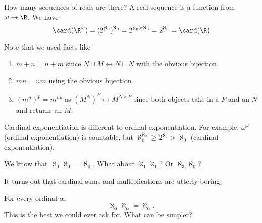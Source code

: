 \documentclass[a4paper]{article}
\begin{document}
\begin{eg}
  How many sequences of reals are there? A real sequence is a function from $\omega \to \R$. We have
  \[
    \card(\R^\omega) = (2^{\aleph_0})^{\aleph_0} = 2^{\aleph_0 \times \aleph_0} = 2^{\aleph_0} = \card(\R)
  \]
\end{eg}
Note that we used facts like
\begin{prop}\leavevmode
  \begin{enumerate}
    \item $m + n = n + m$ since $N\sqcup M \leftrightarrow N\sqcup N$ with the obvious bijection.
    \item $mn = nm$ using the obvious bijection
    \item $(m^n)^p = m^{np}$ as $(M^N)^P \leftrightarrow M^{N\times P}$ since both objects take in a $P$ and an $N$ and returns an $M$.
  \end{enumerate}
\end{prop}
\note Cardinal exponentiation is different to ordinal exponentiation. For example, $\omega^\omega$ (ordinal exponentiation) is countable, but $\aleph_0^{\aleph_0} \geq 2^{\aleph_0} > \aleph_0$ (cardinal exponentiation).

We know that $\aleph_0 \aleph_0 = \aleph_0$. What about $\aleph_1 \aleph_1$? Or $\aleph_3 \aleph_0$?

It turns out that cardinal sums and multiplications are utterly boring:
\begin{thm}[]
  For every ordinal $\alpha$,
  \[
    \aleph_\alpha \aleph_\alpha = \aleph_\alpha.
  \]
  This is the best we could ever ask for. What can be simpler?
\end{thm}
\end{document}
